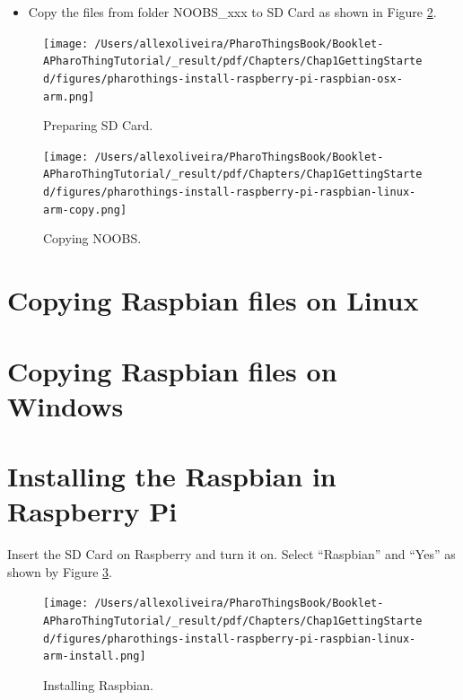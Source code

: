 \documentclass[10pt,twoside,english]{_support/latex/sbabook/sbabook}
\begin{document}
\begin{itemize}
\item Copy the files from folder NOOBS\_xxx to SD Card as shown in Figure \ref{macCopy}.
\end{itemize}


\begin{figure}

\begin{center}
\texttt{[image: /Users/allexoliveira/PharoThingsBook/Booklet-APharoThingTutorial/\_result/pdf/Chapters/Chap1GettingStarted/figures/pharothings-install-raspberry-pi-raspbian-osx-arm.png]}\caption{Preparing SD Card.\label{macInstall}}\end{center}
\end{figure}



\begin{figure}

\begin{center}
\texttt{[image: /Users/allexoliveira/PharoThingsBook/Booklet-APharoThingTutorial/\_result/pdf/Chapters/Chap1GettingStarted/figures/pharothings-install-raspberry-pi-raspbian-linux-arm-copy.png]}\caption{Copying NOOBS.\label{macCopy}}\end{center}
\end{figure}

\section{Copying Raspbian files on Linux}\section{Copying Raspbian files on Windows}\section{Installing the Raspbian in Raspberry Pi}
Insert the SD Card on Raspberry and turn it on. Select “Raspbian” and “Yes” as shown by Figure \ref{install}.


\begin{figure}

\begin{center}
\texttt{[image: /Users/allexoliveira/PharoThingsBook/Booklet-APharoThingTutorial/\_result/pdf/Chapters/Chap1GettingStarted/figures/pharothings-install-raspberry-pi-raspbian-linux-arm-install.png]}\caption{Installing Raspbian.\label{install}}\end{center}
\end{figure}
\end{document}
